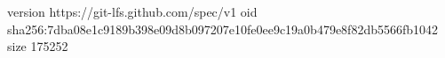 version https://git-lfs.github.com/spec/v1
oid sha256:7dba08e1c9189b398e09d8b097207e10fe0ee9c19a0b479e8f82db5566fb1042
size 175252
